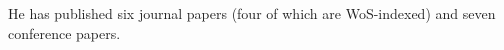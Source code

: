 \noindent He has published six journal papers (four of which are WoS-indexed) and seven conference papers.


\newpage \pagestyle{empty}






\newpage 
